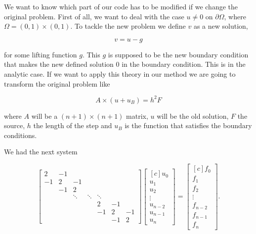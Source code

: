 \documentclass[fontsize=11pt,paper=a4,titlepage]{report}
\begin{document}

We want to know which part of our code has to be modified if we change the 
original problem. First of all, we want to deal with the case $u \neq 0$ on 
$\partial\Omega$, where $\Omega = (0,1) \times (0,1)$. To tackle the new problem
we define $v$ as a new solution,

\begin{equation}
	v = u - g
\end{equation}

for some lifting function $g$. This $g$ is supposed to be the new boundary 
condition that makes the new defined solution $0$ in the boundary condition.
This is in the analytic case. If we want to apply this theory in our method we
are going to transform the original problem like

\begin{displaymath}
	A \times (u + u_B) = h^2 F
\end{displaymath}

where $A$ will be a $(n + 1) \times (n + 1)$ matrix, $u$ will be the old
solution, $F$ the source, $h$ the length of the step and $u_B$ is the function 
that satisfies the boundary conditions.

We had the next system

\begin{displaymath}
\begin{bmatrix}
	2 & -1 &  &  &  &  &  \\
	-1 & 2 & -1 &  &  &  &  \\
	 & -1 & 2 &  &  &  &  \\
	 &  & \ddots & \ddots & \ddots &  & \\
	 &  &  &  & 2 & -1 &  \\
	 &  &  &  & -1 & 2 & -1 \\
	 &  &  &  &  & -1 & 2
\end{bmatrix}
\begin{bmatrix*}[c]
	u_0 \\
	u_1 \\
	u_2 \\
	\vdots \\
	u_{n - 2} \\
	u_{n - 1} \\
	u_n
\end{bmatrix*}
=
\begin{bmatrix*}[c]
	f_0 \\
	f_1 \\
	f_2 \\
	\vdots \\
	f_{n - 2} \\
	f_{n - 1} \\
	f_n
\end{bmatrix*}.
\end{displaymath}
\end{document}
